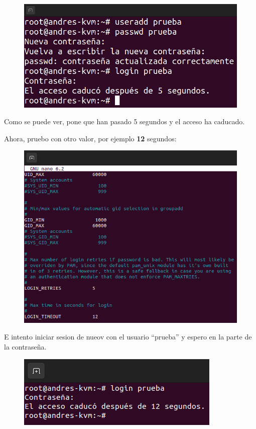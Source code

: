 \documentclass{article}
\begin{document}
\begin{figure}[H]
    \includegraphics[width=\textwidth]{imagenes/tout5login.png}
\end{figure}

Como se puede ver, pone que han pasado 5 segundos y el acceso ha caducado.

Ahora, pruebo con otro valor, por ejemplo \textbf{12} segundos:

\begin{figure}[H]
    \includegraphics[width=\textwidth]{imagenes/tout12.png}
\end{figure}

E intento iniciar sesion de nueov con el usuario ``prueba'' y espero en la parte de la contraseña.

\begin{figure}[H]
    \includegraphics[width=\textwidth]{imagenes/tout12login.png}
\end{figure}
\end{document}
